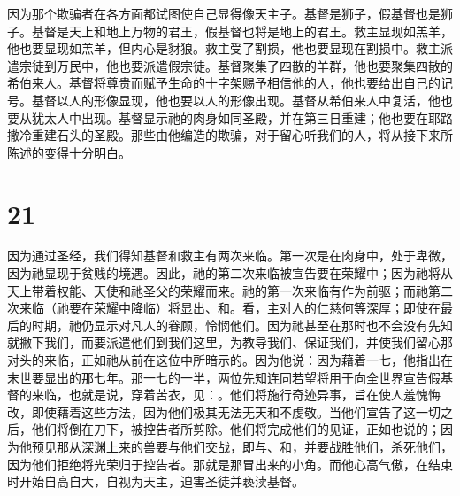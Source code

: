 因为那个欺骗者在各方面都试图使自己显得像天主子。基督是狮子，假基督也是狮子。基督是天上和地上万物的君王，假基督也将是地上的君王。救主显现如羔羊，他也要显现如羔羊，但内心是豺狼。救主受了割损，他也要显现在割损中。救主派遣宗徒到万民中，他也要派遣假宗徒。基督聚集了四散的羊群，他也要聚集四散的希伯来人。基督将尊贵而赋予生命的十字架赐予相信他的人，他也要给出自己的记号。基督以人的形像显现，他也要以人的形像出现。基督从希伯来人中复活，他也要从犹太人中出现。基督显示祂的肉身如同圣殿，并在第三日重建；他也要在耶路撒冷重建石头的圣殿。那些由他编造的欺骗，对于留心听我们的人，将从接下来所陈述的变得十分明白。\par


\section{21}

因为通过圣经，我们得知基督和救主有两次来临。第一次是在肉身中，处于卑微，因为祂显现于贫贱的境遇。因此，祂的第二次来临被宣告要在荣耀中；因为祂将从天上带着权能、天使和祂圣父的荣耀而来。祂的第一次来临有作为前驱；而祂第二次来临（祂要在荣耀中降临）将显出、和。看，主对人的仁慈何等深厚；即使在最后的时期，祂仍显示对凡人的眷顾，怜悯他们。因为祂甚至在那时也不会没有先知就撇下我们，而要派遣他们到我们这里，为教导我们、保证我们，并使我们留心那对头的来临，正如祂从前在这位中所暗示的。因为他说：因为藉着一七，他指出在末世要显出的那七年。那一七的一半，两位先知连同若望将用于向全世界宣告假基督的来临，也就是说，穿着苦衣，见：。他们将施行奇迹异事，旨在使人羞愧悔改，即使藉着这些方法，因为他们极其无法无天和不虔敬。当他们宣告了这一切之后，他们将倒在刀下，被控告者所剪除。他们将完成他们的见证，正如也说的；因为他预见那从深渊上来的兽要与他们交战，即与、和，并要战胜他们，杀死他们，因为他们拒绝将光荣归于控告者。那就是那冒出来的小角。而他心高气傲，在结束时开始自高自大，自视为天主，迫害圣徒并亵渎基督。\par


